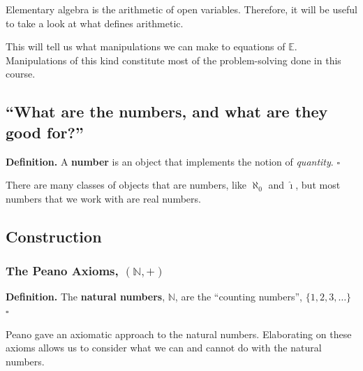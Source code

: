 \documentclass[letterpaper,twoside]{article}
\def\SmallHSpace{\hspace*{1mm}}
\newcommand{\DefinedTerm}[1]{\textbf{#1}}
\newcommand{\Definition}[1]{%
    \emoji{book} \textbf{Definition.}\SmallHSpace #1 \hfill $\square$
}
\begin{document}
\begin{multicols}{2}
Elementary algebra is the arithmetic of open variables.
Therefore, it will be useful to take a look at what defines arithmetic.

This will tell us what manipulations we can make to equations of $\mathbb{E}$.
Manipulations of this kind constitute most of the problem-solving done in this course.


\subsection{``What are the numbers, and what are they good for?''}

\Definition
{
    A \DefinedTerm{number} is an object that implements the notion of \textit{quantity}.
}

There are many classes of objects that are numbers, like $\aleph_0$ and $\hat{\imath}$, but most numbers that we work with are real numbers.

\subsection{Construction}

\subsubsection{The Peano Axioms, $(\mathbb{N}, +)$}

\Definition
{
    The \DefinedTerm{natural numbers}, $\mathbb{N}$, are the ``counting numbers'', $\{1, 2, 3,\ldots\}$
}

Peano gave an axiomatic approach to the natural numbers.
Elaborating on these axioms allows us to consider what we can and cannot do with the natural numbers.

\end{multicols}
\end{document}
